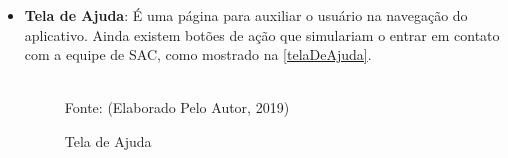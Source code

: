 \begin{itemize}
	\item \textbf{Tela de Ajuda}: É uma página para auxiliar o usuário na navegação do aplicativo. Ainda existem botões de ação que simulariam o entrar em contato com a equipe de SAC, como mostrado na \autoref{telaDeAjuda}.
	\begin{figure}[!htpb]
		\centering
		\caption{Tela de Ajuda}
		\\
		{\footnotesize Fonte: (Elaborado Pelo Autor, 2019)}
		\label{telaDeAjuda}
	\end{figure}
\end{itemize}

